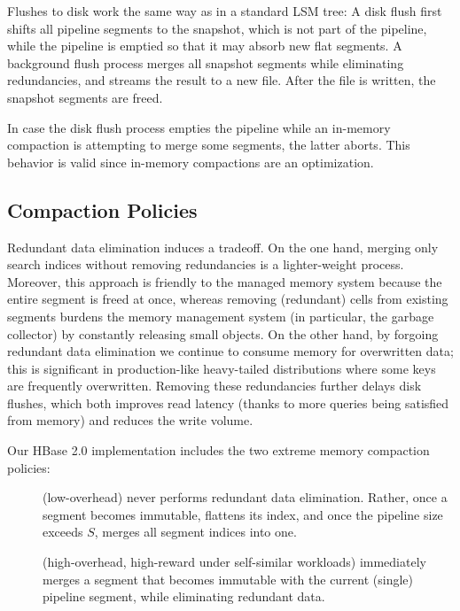 Flushes to disk work the same way as in a standard LSM tree: A disk flush first shifts all pipeline segments to the snapshot, which is not part of the pipeline, while the pipeline is emptied so that
it may absorb new flat segments. 
A background flush process merges all snapshot segments while eliminating  redundancies, and streams the result to a new file. 
After the file is written, the snapshot segments are freed. 

In case the disk flush process empties the pipeline while an in-memory compaction  is attempting to merge some segments, the latter aborts.  This behavior is valid since in-memory compactions are an optimization.

\subsection{Compaction Policies} \label{ssec:policies}

Redundant data elimination induces a tradeoff. On the one hand,
merging only search indices without removing redundancies is a lighter-weight process.  
Moreover, this approach is friendly to the managed memory system because the entire segment is freed at once, whereas 
removing (redundant) cells from existing segments burdens the memory management system (in particular, the garbage collector) by
constantly releasing small objects. On the other hand, by forgoing redundant data elimination we continue to 
consume memory for overwritten data; this is significant in production-like heavy-tailed distributions where some keys are frequently overwritten.
Removing these redundancies further delays disk flushes, which both improves read latency  (thanks to more 
queries being satisfied from memory) and reduces the write volume.

Our HBase 2.0 implementation includes the two extreme memory compaction policies:
\begin{description}
\item[\basic] (low-overhead) never performs redundant data elimination. Rather, 
once a segment becomes immutable, flattens its index, and once the pipeline size exceeds $S$, merges all segment indices into one.   
\item[\eager] (high-overhead, high-reward under self-similar workloads) immediately merges a segment that becomes immutable 
with the current  (single) pipeline segment, while eliminating redundant data.
\end{description}

